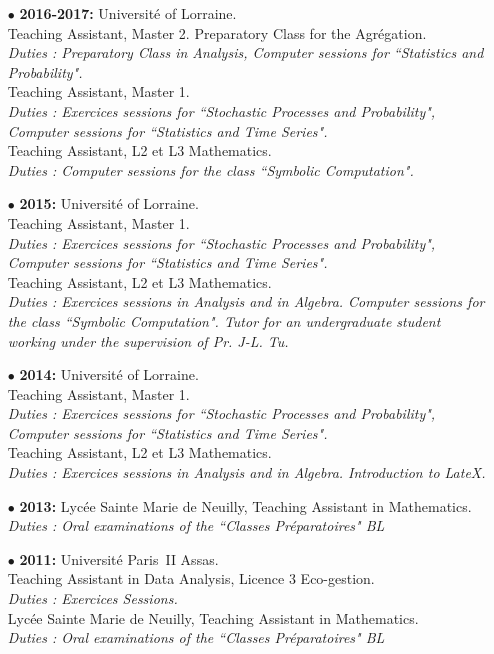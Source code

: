 \documentclass[a4paper,11pt]{article}
\begin{document}
\begin{itemize}
\item[$\bullet$] \textbf{2016-2017:} Universit\'e of Lorraine.\\
					Teaching Assistant, Master 2. Preparatory Class for the Agrégation.\\
					\textit{Duties : Preparatory Class in Analysis, Computer sessions for ``Statistics and Probability".}\\
					Teaching Assistant, Master 1.\\
					\textit{Duties : Exercices sessions for ``Stochastic Processes and Probability", Computer sessions for ``Statistics and Time Series".}\\
					Teaching Assistant, L2 et L3 Mathematics. \\
					\textit{Duties : Computer sessions for the class ``Symbolic Computation".}\\   
\item[$\bullet$] \textbf{2015:} Universit\'e of Lorraine.\\
					Teaching Assistant, Master 1.\\
					\textit{Duties : Exercices sessions for ``Stochastic Processes and Probability", Computer sessions for ``Statistics and Time Series".}\\
					Teaching Assistant, L2 et L3 Mathematics. \\
					\textit{Duties : Exercices sessions in Analysis and in Algebra. Computer sessions for the class ``Symbolic Computation". Tutor for an undergraduate student working under the supervision of Pr. J-L. Tu.}\\   
					
\item[$\bullet$] \textbf{2014:}  Universit\'e of Lorraine.\\
					Teaching Assistant, Master 1. \\
					\textit{Duties : Exercices sessions for ``Stochastic Processes and Probability", Computer sessions for ``Statistics and Time Series".}\\
					Teaching Assistant, L2 et L3 Mathematics. \\
					\textit{Duties : Exercices sessions in Analysis and in Algebra. Introduction to LateX.}\\
\item[$\bullet$] \textbf{2013:} Lycée Sainte Marie de Neuilly, Teaching Assistant in Mathematics. \\
					\textit{Duties : Oral examinations of the ``Classes Préparatoires" BL} \\
\item[$\bullet$] \textbf{2011:} Universit\'e Paris~II Assas.\\
					Teaching Assistant in Data Analysis, Licence 3 Eco-gestion.\\
					\textit{Duties : Exercices Sessions.}\\
					Lycée Sainte Marie de Neuilly, Teaching Assistant in Mathematics. \\
					\textit{Duties : Oral examinations of the ``Classes Préparatoires" BL} 
\end{itemize}
\end{document}
